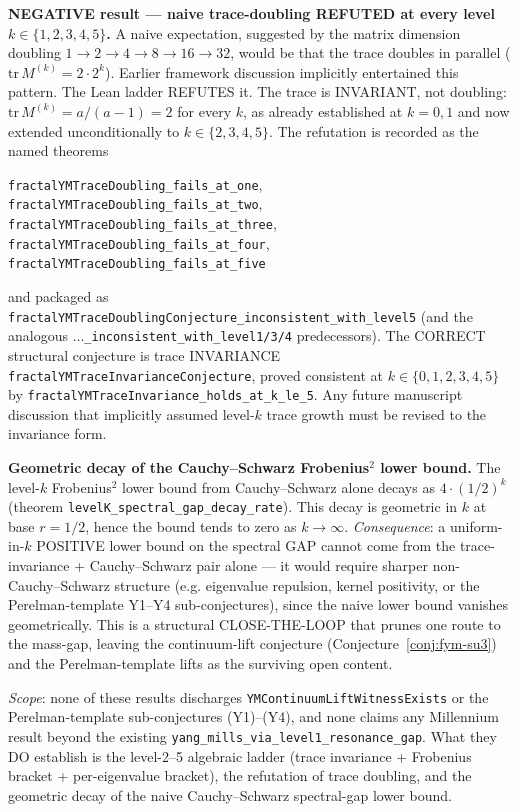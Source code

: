 \begin{remark}
\textbf{NEGATIVE result --- naive trace-doubling REFUTED at every level $k \in \{1,2,3,4,5\}$.} A naive expectation, suggested by the matrix dimension doubling $1 \to 2 \to 4 \to 8 \to 16 \to 32$, would be that the trace doubles in parallel ($\mathrm{tr}\,M^{(k)} = 2 \cdot 2^k$). Earlier framework discussion implicitly entertained this pattern. The Lean ladder REFUTES it. The trace is INVARIANT, not doubling: $\mathrm{tr}\,M^{(k)} = a/(a-1) = 2$ for every $k$, as already established at $k = 0, 1$ and now extended unconditionally to $k \in \{2, 3, 4, 5\}$. The refutation is recorded as the named theorems

\noindent\texttt{fractalYMTraceDoubling\_fails\_at\_one},
\texttt{fractalYMTraceDoubling\_fails\_at\_two},
\texttt{fractalYMTraceDoubling\_fails\_at\_three},
\texttt{fractalYMTraceDoubling\_fails\_at\_four},
\texttt{fractalYMTraceDoubling\_fails\_at\_five}

\noindent and packaged as \texttt{fractalYMTraceDoublingConjecture\_inconsistent\_with\_level5} (and the analogous $\ldots$\texttt{\_inconsistent\_with\_level1/3/4} predecessors). The CORRECT structural conjecture is trace INVARIANCE \texttt{fractalYMTraceInvarianceConjecture}, proved consistent at $k \in \{0,1,2,3,4,5\}$ by \texttt{fractalYMTraceInvariance\_holds\_at\_k\_le\_5}. Any future manuscript discussion that implicitly assumed level-$k$ trace growth must be revised to the invariance form.

\textbf{Geometric decay of the Cauchy--Schwarz Frobenius$^2$ lower bound.} The level-$k$ Frobenius$^2$ lower bound from Cauchy--Schwarz alone decays as $4 \cdot (1/2)^k$ (theorem \texttt{levelK\_spectral\_gap\_decay\_rate}). This decay is geometric in $k$ at base $r = 1/2$, hence the bound tends to zero as $k \to \infty$. \emph{Consequence}: a uniform-in-$k$ POSITIVE lower bound on the spectral GAP cannot come from the trace-invariance + Cauchy--Schwarz pair alone --- it would require sharper non-Cauchy--Schwarz structure (e.g. eigenvalue repulsion, kernel positivity, or the Perelman-template Y1--Y4 sub-conjectures), since the naive lower bound vanishes geometrically. This is a structural CLOSE-THE-LOOP that prunes one route to the mass-gap, leaving the continuum-lift conjecture (Conjecture~\ref{conj:fym-su3}) and the Perelman-template lifts as the surviving open content.

\emph{Scope}: none of these results discharges \texttt{YMContinuumLiftWitnessExists} or the Perelman-template sub-conjectures (Y1)--(Y4), and none claims any Millennium result beyond the existing \texttt{yang\_mills\_via\_level1\_resonance\_gap}. What they DO establish is the level-2--5 algebraic ladder (trace invariance + Frobenius bracket + per-eigenvalue bracket), the refutation of trace doubling, and the geometric decay of the naive Cauchy--Schwarz spectral-gap lower bound.
\end{remark}

